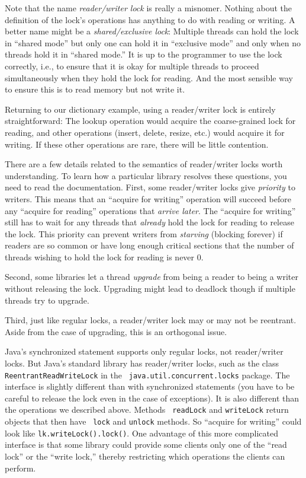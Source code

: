 \documentclass[10pt]{article}
\begin{document}
Note that the name \emph{reader/writer lock} is really a misnomer.
Nothing about the definition of the lock's operations has anything to
do with reading or writing.  A better name might be a
\emph{shared/exclusive lock}: Multiple threads can hold the lock in
``shared mode'' but only one can hold it in ``exclusive mode'' and
only when no threads hold it in ``shared mode.''  It is up to the
programmer to use the lock correctly, i.e., to ensure that it is okay
for multiple threads to proceed simultaneously when they hold the lock for
reading.  And the most sensible way to ensure this is to read memory
but not write it.

Returning to our dictionary example, using a reader/writer lock is
entirely straightforward: The lookup operation would acquire the
coarse-grained lock for reading, and other operations (insert, delete,
resize, etc.) would acquire it for writing.  If these other operations
are rare, there will be little contention.

There are a few details related to the semantics of reader/writer
locks worth understanding.  To learn how a particular library resolves these
questions, you need to read the documentation.  First, some
reader/writer locks give \emph{priority} to writers.  This means that
an ``acquire for writing'' operation will succeed before any ``acquire
for reading'' operations that \emph{arrive later}.  The ``acquire for
writing'' still has to wait for any threads that \emph{already} hold
the lock for reading to release the lock.  This priority can prevent
writers from \emph{starving} (blocking forever) if readers are so
common or have long enough critical sections that the number of
threads wishing to hold the lock for reading is never 0.

Second, some libraries let a thread \emph{upgrade} from being a reader
to being a writer without releasing the lock.  Upgrading might lead to
deadlock though if multiple threads try to upgrade.

Third, just like regular locks, a reader/writer lock may or may not
be reentrant.  Aside from the case of upgrading, this is an orthogonal
issue.

Java's synchronized statement supports only regular locks, not
reader/writer locks.  But Java's standard library has reader/writer
locks, such as the class {\tt ReentrantReadWriteLock} in the {\tt
  java.util.concurrent.locks} package.  The interface is slightly
different than with synchronized statements (you have to be careful to
release the lock even in the case of exceptions).  It is also
different than the operations we described above.  Methods {\tt
  readLock} and {\tt writeLock} return objects that then have {\tt
  lock} and {\tt unlock} methods.  So ``acquire for writing'' could
look like {\tt lk.writeLock().lock()}.  One advantage of this more
complicated interface is that some library could provide some clients
only one of the ``read lock'' or the ``write lock,'' thereby
restricting which operations the clients can perform.
\end{document}
